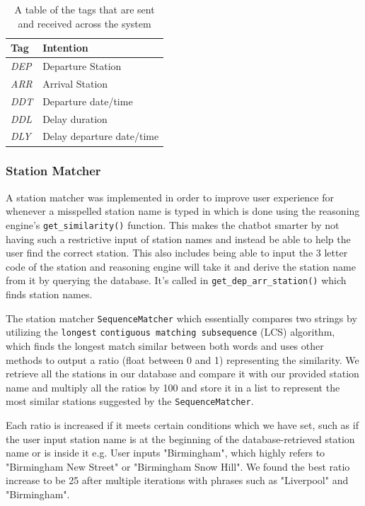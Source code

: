 \documentclass[11pt]{article}
\newcommand{\code}[1]{{\texttt{#1}}}
\begin{document}
        \begin{table}[!ht]
\centering
\begin{tabular}{|l|l|}
\hline
\textbf{Tag} & \textbf{Intention}  \\ \hline
\textit{DEP} & Departure Station   \\ \hline
\textit{ARR} & Arrival Station     \\ \hline
\textit{DDT} & Departure date/time \\ \hline
\textit{DDL} & Delay duration      \\ \hline
\textit{DLY} & Delay departure date/time      \\ \hline
\end{tabular}
\caption{A table of the tags that are sent and received across the system}
\label{tab:TagDesignRE}
\end{table}
    
    
    
        \subsubsection{Station Matcher}
        A station matcher was implemented in order to improve user experience for whenever a misspelled station name is typed in which is done using the reasoning engine's \code{get\_similarity()} function. This makes the chatbot smarter by not having such a restrictive input of station names and instead be able to help the user find the correct station. This also includes being able to input the 3 letter code of the station and reasoning engine will take it and derive the station name from it by querying the database. It's called in \code{get\_dep\_arr\_station()} which finds station names.
        
        The station matcher \code{SequenceMatcher} which essentially compares two strings by utilizing the \code{longest} \code{contiguous matching subsequence} (LCS) algorithm, which finds the longest match similar between both words and uses other methods to output a ratio (float between 0 and 1) representing the similarity. We retrieve all the stations in our database and compare it with our provided station name and multiply all the ratios by 100 and store it in a list to represent the most similar stations suggested by the \code{SequenceMatcher}.
        
        Each ratio is increased if it meets certain conditions which we have set, such as if the user input station name is at the beginning of the database-retrieved station name or is inside it e.g. User inputs "Birmingham", which highly refers to "Birmingham New Street" or "Birmingham Snow Hill". We found the best ratio increase to be 25 after multiple iterations with phrases such as "Liverpool" and "Birmingham".
        
\end{document}
